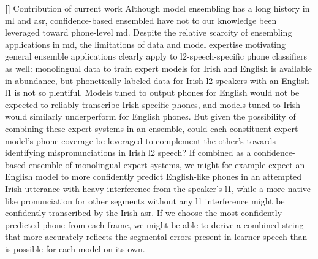 \documentclass[thesis]{cluu}
\newcounter{paranum}
\newcommand{\numberedparagraph}{\par\refstepcounter{paranum}\textbf{[\theparanum] }}
\begin{document}
\numberedparagraph{Contribution of current work}
Although model ensembling has a long history in \gls{ml} and \gls{asr}, confidence-based ensembled have not to our knowledge been leveraged toward phone-level \gls{md}. Despite the relative scarcity of ensembling applications in \gls{md}, the limitations of data and model expertise motivating general ensemble applications clearly apply to \gls{l2}-speech-specific phone classifiers as well: monolingual data to train expert models for Irish and English is available in abundance, but phonetically labeled data for Irish \gls{l2} speakers with an English \gls{l1} is not so plentiful. Models tuned to output phones for English would not be expected to reliably transcribe Irish-specific phones, and models tuned to Irish would similarly underperform for English phones. But given the possibility of combining these expert systems in an ensemble, could each constituent expert model's phone coverage be leveraged to complement the other's towards identifying mispronunciations in Irish \gls{l2} speech? If combined as a confidence-based ensemble of monolingual expert systems, we might for example expect an English model to more confidently predict English-like phones in an attempted Irish utterance with heavy interference from the speaker's \gls{l1}, while a more native-like pronunciation for other segments without any \gls{l1} interference might be confidently transcribed by the Irish \gls{asr}. If we choose the most confidently predicted phone from each frame, we might be able to derive a combined string that more accurately reflects the segmental errors present in learner speech than is possible for each model on its own. 
\end{document}
